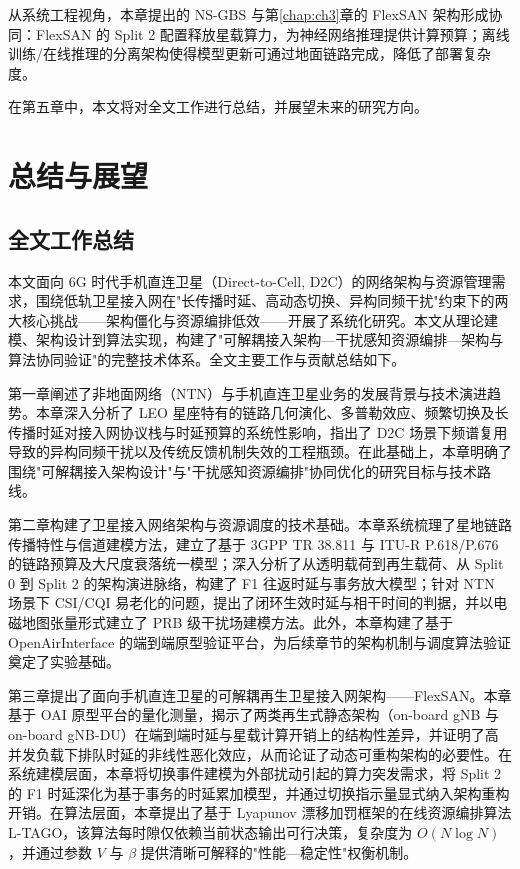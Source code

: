\documentclass[type=master]{fduthesis}
\begin{document}
从系统工程视角，本章提出的 NS-GBS 与第\ref{chap:ch3}章的 FlexSAN 架构形成协同：FlexSAN 的 Split 2 配置释放星载算力，为神经网络推理提供计算预算；离线训练/在线推理的分离架构使得模型更新可通过地面链路完成，降低了部署复杂度。

在第五章中，本文将对全文工作进行总结，并展望未来的研究方向。

\chapter{总结与展望}

\section{全文工作总结}

本文面向 6G 时代手机直连卫星（Direct-to-Cell, D2C）的网络架构与资源管理需求，围绕低轨卫星接入网在"长传播时延、高动态切换、异构同频干扰"约束下的两大核心挑战——架构僵化与资源编排低效——开展了系统化研究。本文从理论建模、架构设计到算法实现，构建了"可解耦接入架构—干扰感知资源编排—架构与算法协同验证"的完整技术体系。全文主要工作与贡献总结如下。

第一章阐述了非地面网络（NTN）与手机直连卫星业务的发展背景与技术演进趋势。本章深入分析了 LEO 星座特有的链路几何演化、多普勒效应、频繁切换及长传播时延对接入网协议栈与时延预算的系统性影响，指出了 D2C 场景下频谱复用导致的异构同频干扰以及传统反馈机制失效的工程瓶颈。在此基础上，本章明确了围绕"可解耦接入架构设计"与"干扰感知资源编排"协同优化的研究目标与技术路线。

第二章构建了卫星接入网络架构与资源调度的技术基础。本章系统梳理了星地链路传播特性与信道建模方法，建立了基于 3GPP TR 38.811 与 ITU-R P.618/P.676 的链路预算及大尺度衰落统一模型；深入分析了从透明载荷到再生载荷、从 Split 0 到 Split 2 的架构演进脉络，构建了 F1 往返时延与事务放大模型；针对 NTN 场景下 CSI/CQI 易老化的问题，提出了闭环生效时延与相干时间的判据，并以电磁地图张量形式建立了 PRB 级干扰场建模方法。此外，本章构建了基于 OpenAirInterface 的端到端原型验证平台，为后续章节的架构机制与调度算法验证奠定了实验基础。

第三章提出了面向手机直连卫星的可解耦再生卫星接入网架构——FlexSAN。本章基于 OAI 原型平台的量化测量，揭示了两类再生式静态架构（on-board gNB 与 on-board gNB-DU）在端到端时延与星载计算开销上的结构性差异，并证明了高并发负载下排队时延的非线性恶化效应，从而论证了动态可重构架构的必要性。在系统建模层面，本章将切换事件建模为外部扰动引起的算力突发需求，将 Split 2 的 F1 时延深化为基于事务的时延累加模型，并通过切换指示量显式纳入架构重构开销。在算法层面，本章提出了基于 Lyapunov 漂移加罚框架的在线资源编排算法 L-TAGO，该算法每时隙仅依赖当前状态输出可行决策，复杂度为 $O(N\log N)$，并通过参数 $V$ 与 $\beta$ 提供清晰可解释的"性能—稳定性"权衡机制。
\end{document}
